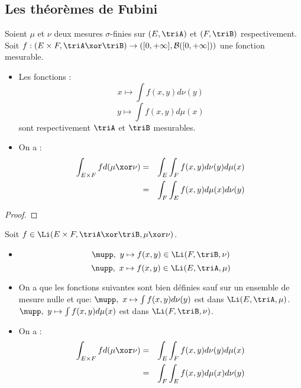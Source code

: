 \subsection{Les théorèmes de Fubini}

\begin{theorem}
	Soient $\mu$ et $\nu$ deux mesures $\sigma$-finies sur $(E, \triA)$ et $(F, \triB)$ respectivement.
	Soit $f: (E \times F, \triA \xor \triB) \to ([0, +\infty], \mathcal{B}([0, +\infty]))$ une fonction mesurable.

	\begin{itemize}
		\item Les fonctions :
		      $$ x \mapsto \int f(x, y) d \nu(y)$$
		      $$ y \mapsto \int f(x, y) d \mu(x)$$
		      sont respectivement $\triA$ et $\triB$ mesurables.
		\item On a :
		      \begin{eqnarray*}
			      \int_{E \times F} f d(\mu \xor \nu) & = & \int_E  \int_F f(x, y) d \nu(y) d \mu(x) \\
			      & = & \int_F  \int_E f(x, y) d \mu(x) d \nu(y)
		      \end{eqnarray*}
	\end{itemize}
\end{theorem}


\begin{proof}
\end{proof}


\begin{theorem}
	Soit $f \in \Li(E \times F, \triA \xor \triB, \mu \xor \nu)$.

	\begin{itemize}
		\item $$ \mupp, \ y \mapsto f(x, y) \in \Li(F, \triB, \nu)$$
		      $$ \nupp, \ x \mapsto f(x, y) \in \Li(E, \triA, \mu)$$
		\item On a que les fonctions suivantes sont bien définies sauf sur un ensemble de mesure nulle et que:
		      $\mupp, \ x \mapsto \int f(x, y) d \nu(y)$ est dans $\Li(E, \triA, \mu)$.\\
		      $\nupp, \ y \mapsto \int f(x, y) d \mu(x)$ est dans $\Li(F, \triB, \nu)$.
		\item On a :
		      \begin{eqnarray*}
			      \int_{E \times F} f d(\mu \xor \nu) & = & \int_E  \int_F f(x, y) d \nu(y) d \mu(x) \\
			      & = & \int_F  \int_E f(x, y) d \mu(x) d \nu(y)
		      \end{eqnarray*}
	\end{itemize}
\end{theorem}


